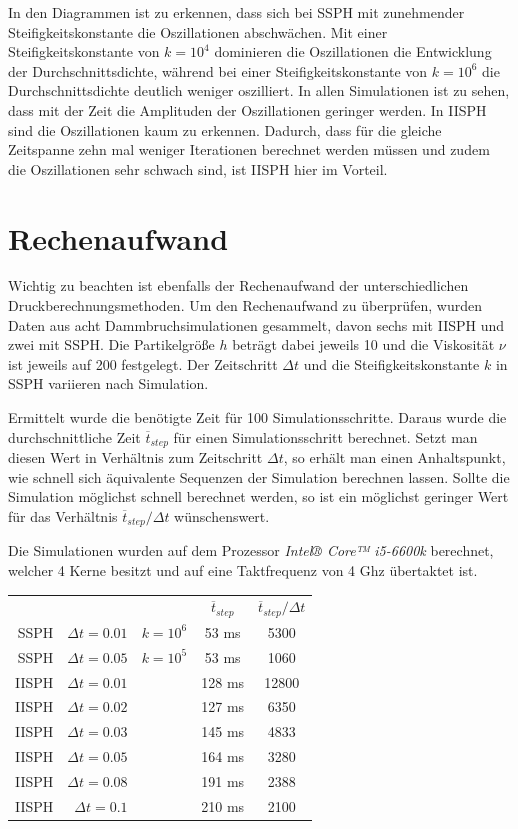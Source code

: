 \documentclass{scrreprt}
\begin{document}
In den Diagrammen ist zu erkennen, dass sich bei SSPH mit zunehmender Steifigkeitskonstante die Oszillationen abschwächen.
Mit einer Steifigkeitskonstante von $k = 10^4$ dominieren die Oszillationen die Entwicklung der Durchschnittsdichte,
während bei einer Steifigkeitskonstante von $k = 10^6$ die Durchschnittsdichte deutlich weniger oszilliert.
In allen Simulationen ist zu sehen, dass mit der Zeit die Amplituden der Oszillationen geringer werden.
In IISPH sind die Oszillationen kaum zu erkennen.
Dadurch, dass für die gleiche Zeitspanne zehn mal weniger Iterationen berechnet werden müssen und zudem die Oszillationen sehr schwach sind,
ist IISPH hier im Vorteil.


\section{Rechenaufwand}
Wichtig zu beachten ist ebenfalls der Rechenaufwand der unterschiedlichen Druckberechnungsmethoden.
Um den Rechenaufwand zu überprüfen, wurden Daten aus acht Dammbruchsimulationen gesammelt, davon sechs mit IISPH und zwei mit SSPH.
Die Partikelgröße $h$ beträgt dabei jeweils 10 und die Viskosität $\nu$ ist jeweils auf 200 festgelegt.
Der Zeitschritt $\Delta t$ und die Steifigkeitskonstante $k$ in SSPH variieren nach Simulation.

Ermittelt wurde die benötigte Zeit für 100 Simulationsschritte.
Daraus wurde die durchschnittliche Zeit $\overline{t}_{step}$ für einen Simulationsschritt berechnet.
Setzt man diesen Wert in Verhältnis zum Zeitschritt $\Delta t$, so erhält man einen Anhaltspunkt, wie schnell sich äquivalente Sequenzen der Simulation berechnen lassen.
Sollte die Simulation möglichst schnell berechnet werden, so ist ein möglichst geringer Wert für das Verhältnis $\overline{t}_{step} / \Delta t$ wünschenswert.

Die Simulationen wurden auf dem Prozessor \textit{Intel® Core™ i5-6600k} berechnet, welcher 4 Kerne besitzt und auf eine Taktfrequenz von 4 Ghz übertaktet ist.

\begin{center}
    \begin{tabular}{ r r r | c c }
        & & & $\overline{t}_{step}$ & $\overline{t}_{step} / \Delta t$\\
        SSPH & $\Delta t = 0.01$ & $k = 10^6$ & 53 ms & 5300\\
        SSPH & $\Delta t = 0.05$ & $k = 10^5$ & 53 ms & 1060\\
        IISPH & $\Delta t = 0.01$ & & 128 ms & 12800\\
        IISPH & $\Delta t = 0.02$ & & 127 ms & 6350\\
        IISPH & $\Delta t = 0.03$ & & 145 ms & 4833\\
        IISPH & $\Delta t = 0.05$ & & 164 ms & 3280\\
        IISPH & $\Delta t = 0.08$ & & 191 ms & 2388\\
        IISPH & $\Delta t = 0.1$ & & 210 ms & 2100\\
    \end{tabular}
\end{center}
\end{document}
